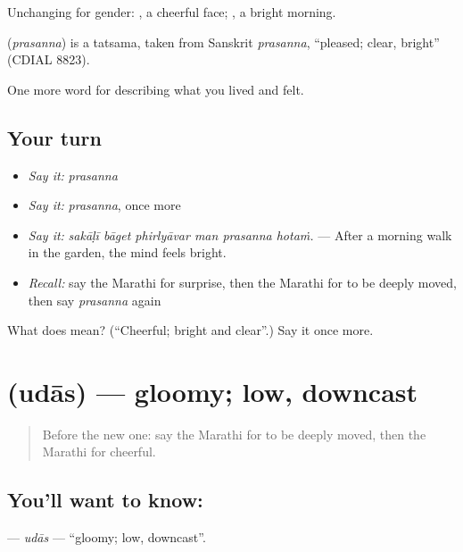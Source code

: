 Unchanging for gender:  , a cheerful face;  , a bright morning.

\begin{cousinweb}
\textbf{} (\emph{prasanna}) is a tatsama, taken from Sanskrit \emph{prasanna}, \textquotedblleft{}pleased; clear, bright\textquotedblright{} (CDIAL 8823).
\end{cousinweb}

\begin{grammarlens}[title={What you've built}]
One more word for describing what you lived and felt.
\end{grammarlens}

\subsection*{Your turn}
\begin{itemize}
\raggedright
  \item \emph{Say it:} \emph{prasanna}
  \item \emph{Say it:} \emph{prasanna}, once more
  \item \emph{Say it:} \emph{sakāḷī bāget phirlyāvar man prasanna hotaṁ.} — After a morning walk in the garden, the mind feels bright.
  \item \emph{Recall:} say the Marathi for surprise, then the Marathi for to be deeply moved, then say \emph{prasanna} again
\end{itemize}

\begin{tcolorbox}[breakable,colback=teal!4,colframe=teal!35!black,title={Before you move on}]
What does  mean? (\textquotedblleft{}Cheerful; bright and clear\textquotedblright{}.) Say it once more.
\end{tcolorbox}
\section[\texorpdfstring{\mr{उदास} (udās)}{उदास (udās)}]{ (udās) — gloomy; low, downcast}

\label{lesson:MR-C451-udas}



\begin{quote}
Before the new one: say the Marathi for to be deeply moved, then the Marathi for cheerful.
\end{quote}

\subsection*{You'll want to know: }
\textbf{} — \emph{udās} — \textquotedblleft{}gloomy; low, downcast\textquotedblright{}.

